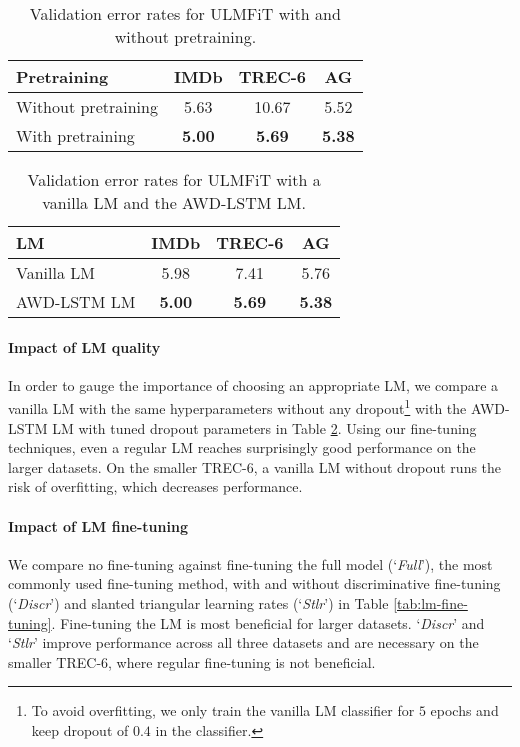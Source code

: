 \documentclass[11pt,a4paper]{article}
\begin{document}
\begin{table}
\centering
\begin{tabular}{l c c c}
\toprule
Pretraining & IMDb & TREC-6 & AG \\
 \midrule
Without pretraining & 5.63 & 10.67 & 5.52 \\
With pretraining & \textbf{5.00} & \textbf{5.69} & \textbf{5.38}\\
\bottomrule
\end{tabular}
\caption{Validation error rates for ULMFiT with and without pretraining.}
\label{tab:pretraining-corpus}
\end{table}

\begin{table}
\centering
\begin{tabular}{l c c c}
\toprule
LM & IMDb & TREC-6 & AG \\
 \midrule
Vanilla LM & 5.98 & 7.41 & 5.76 \\
AWD-LSTM LM & \textbf{5.00} & \textbf{5.69} & \textbf{5.38}\\
\bottomrule
\end{tabular}
\caption{Validation error rates for ULMFiT with a vanilla LM and the AWD-LSTM LM.}
\label{tab:lm-choice}
\end{table}

\paragraph{Impact of LM quality} In order to gauge the importance of choosing an appropriate LM, we compare a vanilla LM with the same hyperparameters without any dropout\footnote{To avoid overfitting, we only train the vanilla LM classifier for $5$ epochs and keep dropout of $0.4$ in the classifier.} with the AWD-LSTM LM with tuned dropout parameters in Table \ref{tab:lm-choice}. Using our fine-tuning techniques, even a regular LM reaches surprisingly good performance on the larger datasets. On the smaller TREC-6, a vanilla LM without dropout runs the risk of overfitting, which decreases performance. 

\paragraph{Impact of LM fine-tuning} We compare no fine-tuning against fine-tuning the full model \cite{erhan2010does} (`\emph{Full}'), the most commonly used fine-tuning method, with and without discriminative fine-tuning (`\emph{Discr}') and slanted triangular learning rates (`\emph{Stlr}') in Table \ref{tab:lm-fine-tuning}. Fine-tuning the LM is most beneficial for larger datasets. `\emph{Discr}' and `\emph{Stlr}' improve performance across all three datasets and are necessary on the smaller TREC-6, where regular fine-tuning is not beneficial.
\end{document}
